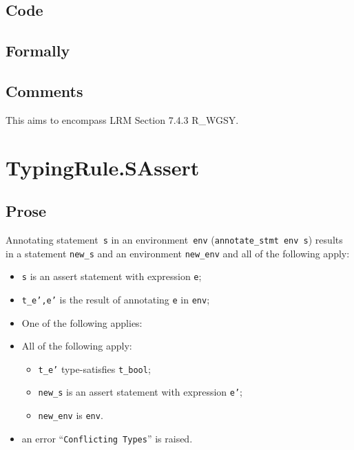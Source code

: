 \documentclass{book}
\begin{document}
  \subsection{Code}

\begin{emptyformal}
    \subsection{Formally}
\end{emptyformal}

\subsection{Comments}
    This aims to encompass LRM Section 7.4.3 R\_WGSY.
  
\section{TypingRule.SAssert \label{sec:TypingRule.SAssert}}

  \subsection{Prose}
Annotating statement~\texttt{s} in an environment~\texttt{env}
(\texttt{annotate\_stmt env s}) results in a statement \texttt{new\_s} and an
environment \texttt{new\_env} and all of the following apply:
   \begin{itemize}
   \item \texttt{s} is an assert statement with expression \texttt{e};
   \item \texttt{t\_e',e'} is the result of annotating \texttt{e} in \texttt{env};
   \item One of the following applies:
     \item All of the following apply:
       \begin{itemize}
       \item \texttt{t\_e'} type-satisfies \texttt{t\_bool};  
       \item \texttt{new\_s} is an assert statement with expression \texttt{e'};
       \item \texttt{new\_env} is \texttt{env}.
       \end{itemize}
     \item an error ``\texttt{Conflicting Types}'' is raised.
   \end{itemize}
\end{document}
